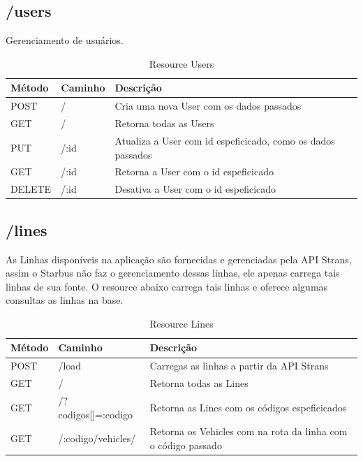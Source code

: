 \subsection{/users}

Gerenciamento de usuários.

\begin{table}[htbp]
	\scriptsize
	\centering
	\begin{tabular}{|l|l|l|}
		\hline \textbf{Método} & \textbf{Caminho} & \textbf{Descrição} \\ 
    \hline POST   & /    & Cria uma nova User com os dados passados \\
		\hline GET    & /    & Retorna todas as Users \\
		\hline PUT    & /:id & Atualiza a User com id espeficicado, como os dados passados \\
		\hline GET    & /:id & Retorna a User com o id espeficicado \\
		\hline DELETE & /:id & Desativa a User com o id espeficicado \\
		\hline 
	\end{tabular}
	\caption{Resource Users}
	\label{tab:resources}
\end{table}

\subsection{/lines}

As Linhas disponíveis na aplicação são fornecidas e gerenciadas pela API Strans, assim o Starbus
não faz o gerenciamento dessas linhas, ele apenas carrega tais linhas de sua fonte. O resource abaixo
carrega tais linhas e oferece algumas consultas as linhas na base.

\begin{table}[htbp]
	\scriptsize
	\centering
	\begin{tabular}{|l|l|l|}
    \hline \textbf{Método} & \textbf{Caminho} & \textbf{Descrição} \\
    \hline POST   & /load & Carregas as linhas a partir da API Strans \\
    \hline GET    & /     & Retorna todas as Lines \\
    \hline GET    & /?codigos[]=:codigo  & Retorna as Lines com os códigos espeficicados \\
    \hline GET    & /:codigo/vehicles/  & Retorna os Vehicles com na rota da linha com o código passado \\
		\hline 
	\end{tabular}
	\caption{Resource Lines}
	\label{tab:resources}
\end{table}

